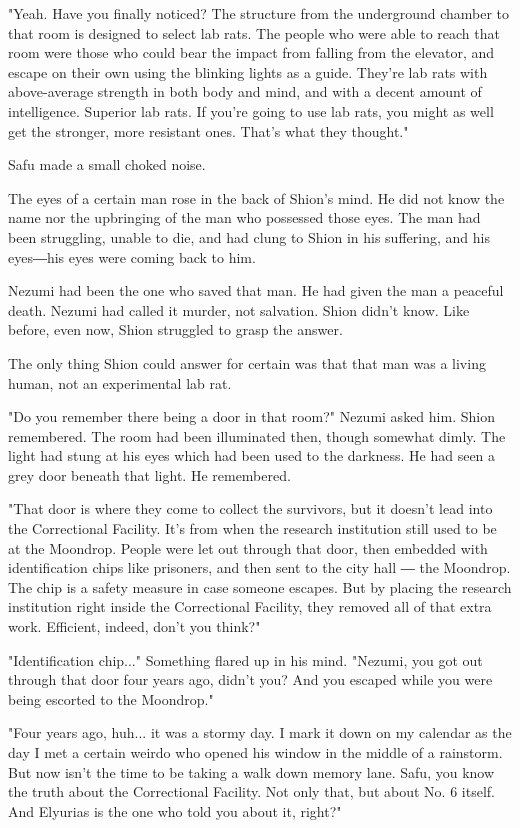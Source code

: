 "Yeah. Have you finally noticed? The structure from the underground
chamber to that room is designed to select lab rats. The people who were
able to reach that room were those who could bear the impact from
falling from the elevator, and escape on their own using the blinking
lights as a guide. They're lab rats with above-average strength in both
body and mind, and with a decent amount of intelligence. Superior lab
rats. If you're going to use lab rats, you might as well get the
stronger, more resistant ones. That's what they thought."

Safu made a small choked noise.

The eyes of a certain man rose in the back of Shion's mind. He did not
know the name nor the upbringing of the man who possessed those eyes.
The man had been struggling, unable to die, and had clung to Shion in
his suffering, and his eyes―his eyes were coming back to him.

Nezumi had been the one who saved that man. He had given the man a
peaceful death. Nezumi had called it murder, not salvation. Shion didn't
know. Like before, even now, Shion struggled to grasp the answer.

The only thing Shion could answer for certain was that that man was a
living human, not an experimental lab rat.

"Do you remember there being a door in that room?" Nezumi asked him.
Shion remembered. The room had been illuminated then, though somewhat
dimly. The light had stung at his eyes which had been used to the
darkness. He had seen a grey door beneath that light. He remembered.

"That door is where they come to collect the survivors, but it doesn't
lead into the Correctional Facility. It's from when the research
institution still used to be at the Moondrop. People were let out
through that door, then embedded with identification chips like
prisoners, and then sent to the city hall ― the Moondrop. The chip is a
safety measure in case someone escapes. But by placing the research
institution right inside the Correctional Facility, they removed all of
that extra work. Efficient, indeed, don't you think?"

"Identification chip..." Something flared up in his mind. "Nezumi, you
got out through that door four years ago, didn't you? And you escaped
while you were being escorted to the Moondrop."

"Four years ago, huh... it was a stormy day. I mark it down on my
calendar as the day I met a certain weirdo who opened his window in the
middle of a rainstorm. But now isn't the time to be taking a walk down
memory lane. Safu, you know the truth about the Correctional Facility.
Not only that, but about No. 6 itself. And Elyurias is the one who told
you about it, right?"

